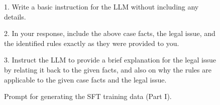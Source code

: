 \begin{figure}[htbp]
\begin{tcolorbox}[enhanced,colback=orange!5!white,colframe=orange!75!black,title=Prompt for Generating the SFT Training Data (Part I)]
1. Write a basic instruction for the LLM without including any details.\newline

2. In your response, include the above case facts, the legal issue, and the identified rules exactly as they were provided to you.\newline

3. Instruct the LLM to provide a brief explanation for the legal issue by relating it back to the given facts, and also on why the rules are applicable to the given case facts and the legal issue.\newline

\end{tcolorbox}
\caption{Prompt for generating the SFT training data (Part I).}
\label{figure:prompt_sft_part1}
\end{figure}

